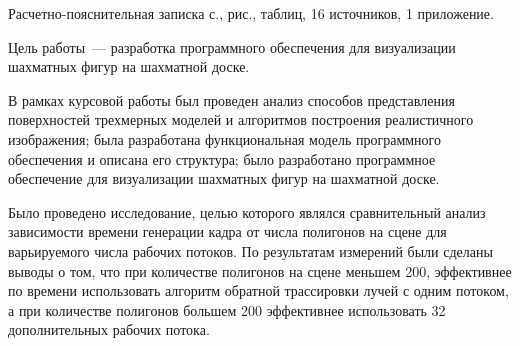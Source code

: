 

Расчетно-пояснительная записка \pageref{LastPage} с., \totalfigures{} рис., \totaltables{} таблиц, 16 источников, 1 приложение.


Цель работы~--- разработка программного обеспечения для визуализации шахматных фигур на шахматной доске.

В рамках курсовой работы был проведен анализ способов представления поверхностей трехмерных моделей и алгоритмов построения реалистичного изображения; была разработана функциональная модель программного обеспечения и описана его структура; было разработано программное обеспечение для визуализации шахматных фигур на шахматной доске.

Было проведено исследование, целью которого являлся сравнительный анализ зависимости времени генерации кадра от числа полигонов на сцене для варьируемого числа рабочих потоков. По результатам измерений были сделаны выводы о том, что при количестве полигонов на сцене меньшем 200, эффективнее по времени использовать алгоритм обратной трассировки лучей с одним потоком, а при  количестве полигонов большем 200 эффективнее использовать 32 дополнительных рабочих потока.

%
%
%
%
